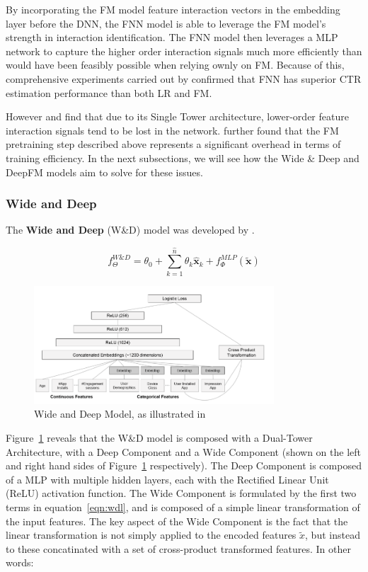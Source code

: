 \documentclass{mldsmsc}
\begin{document}
By incorporating the FM model feature interaction vectors in the embedding layer
before the DNN, the FNN model is able to leverage the FM model's strength in
interaction identification. The FNN model then leverages a MLP network
to capture the higher order interaction signals much more efficiently than would
have been feasibly possible when relying ownly on FM. Because of this, comprehensive
experiments carried out by \cite{RefWorks:zhang2016deep} confirmed that FNN
has superior CTR estimation performance than both LR and FM.

However \cite{RefWorks:guo2017deepfm:} and \cite{RefWorks:zhang2021deep} find that
due to its Single Tower architecture, lower-order feature interaction signals tend
to be lost in the network. \cite{RefWorks:guo2017deepfm:} further found that
the FM pretraining step described above represents a significant overhead in
terms of training efficiency. In the next subsections, we will see how the Wide \& Deep
and DeepFM models aim to solve for these issues.

\subsubsection{Wide and Deep}

The \textbf{Wide and Deep} (W\&D) model was developed by \cite{RefWorks:cheng2016wide}.

\begin{equation}
    \label{eqn:wdl}
    f_{\Theta}^{W\&D} = \theta_0 + \sum_{k=1}^{\hat{n}} \theta_k \hat{\mathbf{x}}_k
    + f_{\Phi}^{MLP}(\tilde{\mathbf{x}})
\end{equation}

\begin{figure}[h]
\centering
\includegraphics[width = 0.8\textwidth]{../figures/wdl.png}
\caption{Wide and Deep Model, as illustrated in \citep{RefWorks:shen2017deepctr:}}
\label{fig:wdl}
\end{figure}

Figure~\ref{fig:wdl} reveals that the W\&D model is composed with a Dual-Tower Architecture,
with a Deep Component and a Wide Component (shown on the left and right hand sides of Figure~\ref{fig:wdl}
respectively). The Deep Component is composed of a MLP with multiple hidden layers, each
with the Rectified Linear Unit (ReLU) activation function. The Wide Component is formulated
by the first two terms in equation~\ref{eqn:wdl}, and is composed of a simple linear transformation
of the input features. The key aspect of the Wide Component is the fact that the 
linear transformation is not simply applied to the encoded features $\tilde{x}$,
but instead to these concatinated with a set of cross-product transformed features. In
other words:
\end{document}
